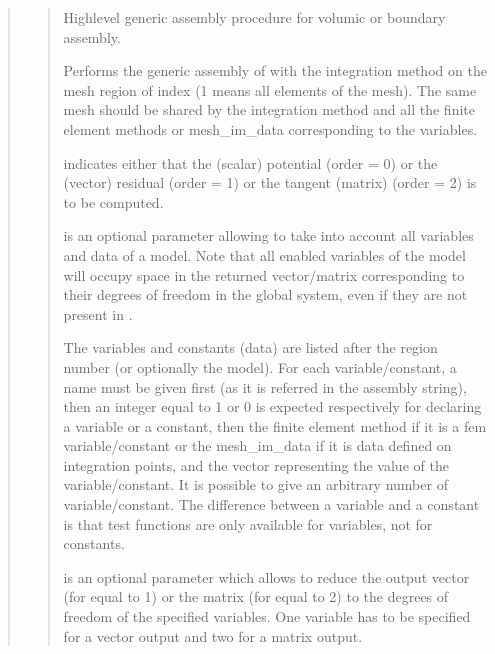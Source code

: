 \documentclass[a4paper,11pt,english]{sphinxmanual}
\begin{document}
\begin{quote}

\begin{quote}

High\sphinxhyphen{}level generic assembly procedure for volumic or boundary assembly.

Performs the generic assembly of  with the integration
method  on the mesh region of index  (\sphinxhyphen{}1 means all
elements of the mesh). The same mesh should be shared by
the integration method and all the finite element methods or
mesh\_im\_data corresponding to the variables.

 indicates either that the (scalar) potential
(order = 0) or the (vector) residual (order = 1) or the
tangent (matrix) (order = 2) is to be computed.

 is an optional parameter allowing to take into account
all variables and data of a model. Note that all enabled variables
of the model will occupy space in the returned vector/matrix
corresponding to their degrees of freedom in the global system, even
if they are not present in .

The variables and constants (data) are listed after the region number
(or optionally the model).
For each variable/constant, a name must be given first (as it is
referred in the assembly string), then an integer equal to 1 or 0
is expected respectively for declaring a variable or a constant,
then the finite element method if it is a fem variable/constant or
the mesh\_im\_data if it is data defined on integration points, and
the vector representing the value of the variable/constant.
It is possible to give an arbitrary number of variable/constant.
The difference between a variable and a constant is that test
functions are only available for variables, not for constants.

 is an optional parameter which allows to reduce the
output vector (for  equal to 1) or the matrix (for 
equal to 2) to the degrees of freedom of the specified variables.
One variable has to be specified for a vector output and two for a
matrix output.


\end{quote}
\end{quote}
\end{document}
